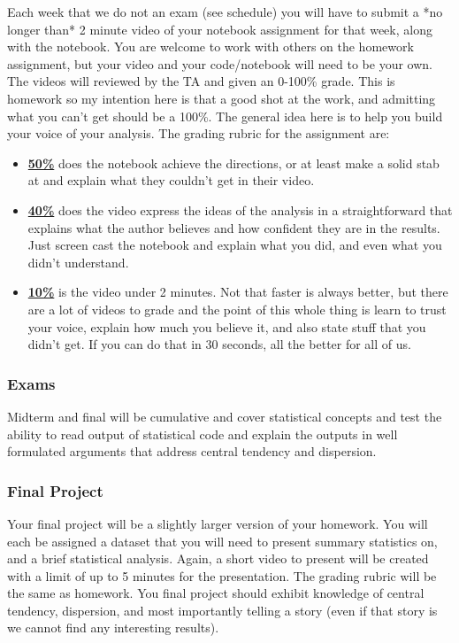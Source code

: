 \documentclass[11pt]{article}
\begin{document}
Each week that we do not an exam (see schedule) you will have to submit a *no longer than* 2 minute video of your notebook assignment for that week, along with the notebook. You are welcome to work with others on the homework assignment, but your video and your code/notebook will need to be your own. The videos will reviewed by the TA and given an 0-100\% grade. This is homework so my intention here is that a good shot at the work, and admitting what you can't get should be a 100\%. The general idea here is to help you build your voice of your analysis. The grading rubric for the assignment are:
  \begin{itemize}
\item \underline{\textbf{50\%}} does the notebook achieve the directions, or at least make a solid stab at and explain what they couldn't get in their video.  
	\item \underline{\textbf{40\%}} does the video express the ideas of the analysis in a straightforward that explains what the author believes and how confident they are in the results. Just screen cast the notebook and explain what you did, and even what you didn't understand. 
\item \underline{\textbf{10\%}} is the video under 2 minutes. Not that faster is always better, but there are a lot of videos to grade and the point of this whole thing is learn to trust your voice, explain how much you believe it, and also state stuff that you didn't get. If you can do that in 30 seconds, all the better for all of us.   
\end{itemize}

\subsubsection*{Exams}
Midterm and final will be cumulative and cover statistical concepts and test the ability to read output of statistical code and explain the outputs in well formulated arguments that address central tendency and dispersion.

\subsubsection*{Final Project}
Your final project will be a slightly larger version of your homework. You will each be assigned a dataset that you will need to present summary statistics on, and a brief statistical analysis. Again, a short video to present will be created with a limit of up to 5 minutes for the presentation. The grading rubric will be the same as homework. You final project should exhibit knowledge of central tendency, dispersion, and most importantly telling a story (even if that story is we cannot find any interesting results). 
\end{document}
